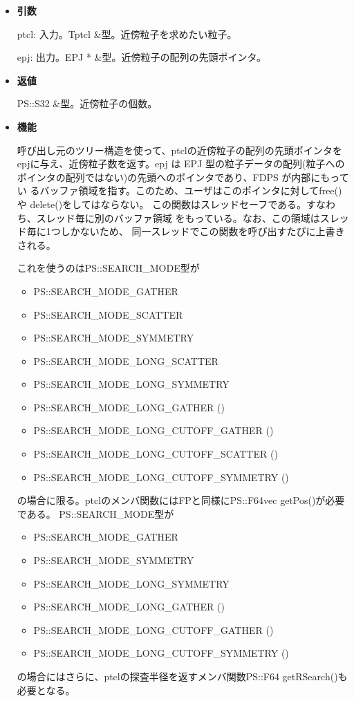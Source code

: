 \begin{itemize}

\item {\bf 引数}

ptcl: 入力。Tptcl \&型。近傍粒子を求めたい粒子。

epj: 出力。EPJ * \&型。近傍粒子の配列の先頭ポインタ。

\item {\bf 返値}

PS::S32 \&型。近傍粒子の個数。

\item {\bf 機能}

呼び出し元のツリー構造を使って、ptclの近傍粒子の配列の先頭ポインタを
epjに与え、近傍粒子数を返す。epj は EPJ 型の粒子データの配列(粒子への
ポインタの配列ではない)の先頭へのポインタであり、FDPS が内部にもってい
るバッファ領域を指す。このため、ユーザはこのポインタに対してfree()や
delete()をしてはならない。
この関数はスレッドセーフである。すなわち、スレッド毎に別のバッファ領域
をもっている。なお、この領域はスレッド毎に1つしかないため、
同一スレッドでこの関数を呼び出すたびに上書きされる。


これを使うのはPS::SEARCH\_MODE型が
\begin{itemize}[itemsep=-1ex]
\item PS::SEARCH\_MODE\_GATHER
\item PS::SEARCH\_MODE\_SCATTER
\item PS::SEARCH\_MODE\_SYMMETRY
\item PS::SEARCH\_MODE\_LONG\_SCATTER
\item PS::SEARCH\_MODE\_LONG\_SYMMETRY
\item PS::SEARCH\_MODE\_LONG\_GATHER ()
\item PS::SEARCH\_MODE\_LONG\_CUTOFF\_GATHER ()
\item PS::SEARCH\_MODE\_LONG\_CUTOFF\_SCATTER ()
\item PS::SEARCH\_MODE\_LONG\_CUTOFF\_SYMMETRY ()
\end{itemize}
の場合に限る。ptclのメンバ関数にはFPと同様にPS::F64vec getPos()が必要である。
PS::SEARCH\_MODE型が
\begin{itemize}[itemsep=-1ex]
\item PS::SEARCH\_MODE\_GATHER
\item PS::SEARCH\_MODE\_SYMMETRY
\item PS::SEARCH\_MODE\_LONG\_SYMMETRY
\item PS::SEARCH\_MODE\_LONG\_GATHER ()
\item PS::SEARCH\_MODE\_LONG\_CUTOFF\_GATHER ()
\item PS::SEARCH\_MODE\_LONG\_CUTOFF\_SYMMETRY ()
\end{itemize}
の場合にはさらに、ptclの探査半径を返すメンバ関数PS::F64 getRSearch()も必要となる。

\end{itemize}


